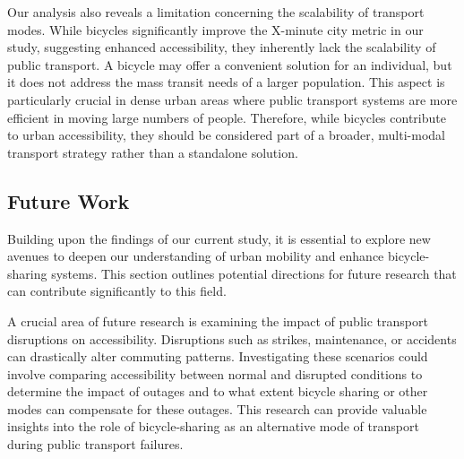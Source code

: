 Our analysis also reveals a limitation concerning the scalability of transport modes. 
While bicycles significantly improve the X-minute city metric in our study, suggesting enhanced accessibility, they inherently lack the scalability of public transport. 
A bicycle may offer a convenient solution for an individual, but it does not address the mass transit needs of a larger population. 
This aspect is particularly crucial in dense urban areas where public transport systems are more efficient in moving large numbers of people. 
Therefore, while bicycles contribute to urban accessibility, they should be considered part of a broader, multi-modal transport strategy rather than a standalone solution.


\subsection{Future Work}
\label{sec:future_work}

Building upon the findings of our current study, it is essential to explore new avenues to deepen our understanding of urban mobility and enhance bicycle-sharing systems. 
This section outlines potential directions for future research that can contribute significantly to this field.

A crucial area of future research is examining the impact of public transport disruptions on accessibility.
Disruptions such as strikes, maintenance, or accidents can drastically alter commuting patterns. 
Investigating these scenarios could involve comparing accessibility between normal and disrupted conditions to determine the impact of outages and to what extent bicycle sharing or other modes can compensate for these outages.
This research can provide valuable insights into the role of bicycle-sharing as an alternative mode of transport during public transport failures.

